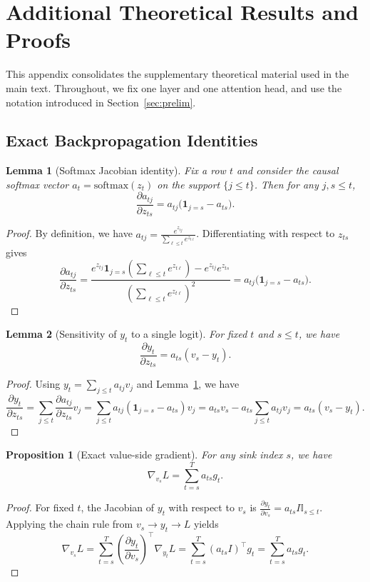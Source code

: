 \documentclass{article}
\theoremstyle{plain}
\newtheorem{proposition}{Proposition}
\newtheorem{lemma}{Lemma}
\theoremstyle{definition}
\theoremstyle{remark}
\begin{document}
\section{Additional Theoretical Results and Proofs}\label{app:theory}
This appendix consolidates the supplementary theoretical material used in the main text. Throughout, we fix one layer and one attention head, and use the notation introduced in Section~\ref{sec:prelim}.

\subsection{Exact Backpropagation Identities}\label{app:theory:exact}

\begin{lemma}[Softmax Jacobian identity]\label{lem:softmax-jacobian-app}
Fix a row $t$ and consider the causal softmax vector $a_t = \mathrm{softmax}(z_t)$ on the support $\{j \le t\}$. Then for any $j,s \le t$,
\[
    \frac{\partial a_{tj}}{\partial z_{ts}} = a_{tj} \bigl(\mathbf{1}_{j=s} - a_{ts}\bigr).
\]
\end{lemma}
\begin{proof}
By definition, we have $a_{tj} = \frac{e^{z_{tj}}}{\sum_{\ell \le t} e^{z_{t\ell}}}$. Differentiating with respect to $z_{ts}$ gives
\[
    \frac{\partial a_{tj}}{\partial z_{ts}}
    = \frac{e^{z_{tj}} \mathbf{1}_{j=s} \left(\sum_{\ell \le t} e^{z_{t\ell}}\right) - e^{z_{tj}} e^{z_{ts}}}{\left(\sum_{\ell \le t} e^{z_{t\ell}}\right)^2}
    = a_{tj} \bigl(\mathbf{1}_{j=s} - a_{ts}\bigr).
\]
\end{proof}

\begin{lemma}[Sensitivity of $y_t$ to a single logit]\label{lem:yt-logit-app}
For fixed $t$ and $s \le t$, we have
\[
    \frac{\partial y_t}{\partial z_{ts}} = a_{ts} (v_s - y_t).
\]
\end{lemma}
\begin{proof}
Using $y_t = \sum_{j \le t} a_{tj} v_j$ and Lemma~\ref{lem:softmax-jacobian-app}, we have
\[
    \frac{\partial y_t}{\partial z_{ts}}
    = \sum_{j \le t} \frac{\partial a_{tj}}{\partial z_{ts}} v_j
    = \sum_{j \le t} a_{tj} (\mathbf{1}_{j=s} - a_{ts}) v_j
    = a_{ts} v_s - a_{ts} \sum_{j \le t} a_{tj} v_j
    = a_{ts}(v_s - y_t).
\]
\end{proof}

\begin{proposition}[Exact value-side gradient]\label{prop:v-exact-app}
For any sink index $s$, we have
\[
    \nabla_{v_s} L = \sum_{t=s}^T a_{ts} g_t.
\]
\end{proposition}
\begin{proof}
For fixed $t$, the Jacobian of $y_t$ with respect to $v_s$ is $\frac{\partial y_t}{\partial v_s} = a_{ts} I \mathbb{I}_{s\le t}$. Applying the chain rule from $v_s \to y_t \to L$ yields
\[
    \nabla_{v_s} L
    = \sum_{t=s}^T \left(\frac{\partial y_t}{\partial v_s}\right)^\top \nabla_{y_t} L
    = \sum_{t=s}^T (a_{ts} I)^\top g_t
    = \sum_{t=s}^T a_{ts} g_t.
\]
\end{proof}
\end{document}
